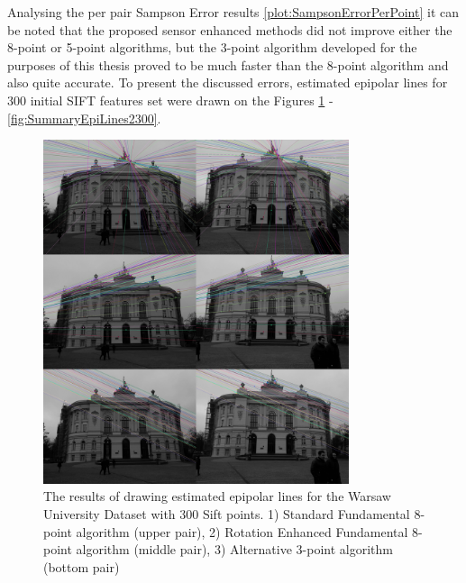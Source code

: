 Analysing the per pair Sampson Error results \ref{plot:SampsonErrorPerPoint} it can be noted that the proposed sensor enhanced methods did not improve either the 8-point or 5-point algorithms, but the 3-point algorithm developed for the purposes of this thesis proved to be much faster than the 8-point algorithm and also quite accurate. To present the discussed errors, estimated epipolar lines for 300 initial SIFT features set were drawn on the Figures \ref{fig:SummaryEpiLines1300} - \ref{fig:SummaryEpiLines2300}.
\begin{figure}[b!]
    \centering
    \includegraphics[width=0.8\textwidth]{summary1Sift300}
    \caption[The results of drawing estimated epipolar lines for the Warsaw University Dataset with 300 Sift points (1st group)]{The results of drawing estimated epipolar lines for the Warsaw University Dataset with 300 Sift points. 1) Standard Fundamental 8-point algorithm (upper pair), 2) Rotation Enhanced Fundamental 8-point algorithm (middle pair), 3) Alternative 3-point algorithm (bottom pair) }
    \label{fig:SummaryEpiLines1300}
\end{figure}
